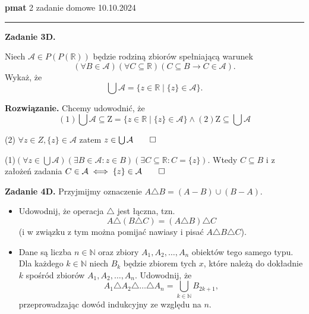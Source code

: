 \documentclass[a4paper, hidelinks, 12pt]{article}
\begin{document}
\begin{Large}
    \textbf{pmat}
    \hfill
    2 zadanie domowe
    \hfill
    10.10.2024
\end{Large}

\rule{\textwidth}{1pt}

\textbf{Zadanie 3D.}

Niech $\mathcal{A} \in P(P(\mathbb{R}))$ będzie rodziną zbiorów spełniającą warunek
\[
(\forall B \in \mathcal{A})(\forall C \subseteq \mathbb{R})(C \subseteq B \rightarrow C \in \mathcal{A}).
\]
Wykaż, że
\[
\bigcup \mathcal{A} = \{z \in \mathbb{R} \mid \{z\} \in \mathcal{A}\}.
\]

\textbf{Rozwiązanie.}
Chcemy udowodnić, że \[ (1)
\bigcup \mathcal{A} \subseteq \text{Z} = \{z \in \mathbb{R} \mid \{z\} \in \mathcal{A}\} \land (2) \text{Z} \subseteq \bigcup \mathcal{A} \]

(2) \( \forall z \in Z, \{z\} \in \mathcal{A}\) zatem \( z \in \bigcup \mathcal{A} \qed\)

(1)\( ( \forall z \in \bigcup \mathcal{A} ) ( \exists B \in \mathcal{A}: z \in B) ( \exists C \subseteq \mathbb{R} : C = \{z\}) \). Wtedy \( C \subseteq B \) i z założeń zadania \( C \in \mathcal{A} \iff \{z\} \in \mathcal{A} \qed \) 

\textbf{Zadanie 4D.} Przyjmijmy oznaczenie $A \triangle B = (A - B) \cup (B - A)$.
\begin{itemize}
    \item[(a)] Udowodnij, że operacja $\triangle$ jest łączna, tzn.
    \[
    A \triangle (B \triangle C) = (A \triangle B) \triangle C
    \]
    (i w związku z tym można pomijać nawiasy i pisać $A \triangle B \triangle C$).
    
    \item[(b)] Dane są liczba $n \in \mathbb{N}$ oraz zbiory $A_1, A_2, \ldots, A_n$ obiektów tego samego typu. Dla każdego $k \in \mathbb{N}$ niech $B_k$ będzie zbiorem tych $x$, które należą do dokładnie $k$ spośród zbiorów $A_1, A_2, \ldots, A_n$. Udowodnij, że
    \[
    A_1 \triangle A_2 \triangle \ldots \triangle A_n = \bigcup_{k \in \mathbb{N}} B_{2k+1},
    \]
    przeprowadzając dowód indukcyjny ze względu na $n$.
\end{itemize}
\end{document}
